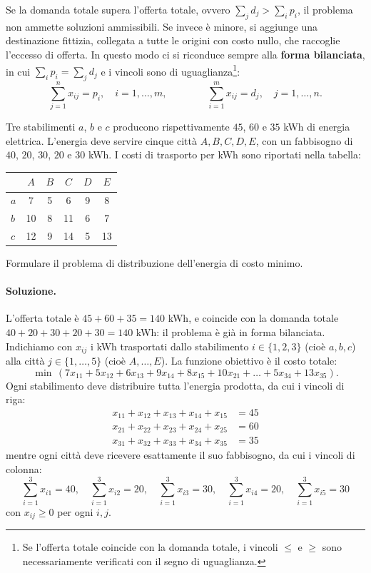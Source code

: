 Se la domanda totale supera l'offerta totale, ovvero $\sum_j d_j > \sum_i p_i$, il problema non ammette soluzioni ammissibili. Se invece è minore, si aggiunge una destinazione fittizia, collegata a tutte le origini con costo nullo, che raccoglie l'eccesso di offerta. In questo modo ci si riconduce sempre alla \textbf{forma bilanciata}, in cui $\sum_i p_i = \sum_j d_j$ e i vincoli sono di uguaglianza\footnote{Se l'offerta totale coincide con la domanda totale, i vincoli $\le$ e $\ge$ sono necessariamente verificati con il segno di uguaglianza.}:
\[
\sum_{j=1}^{n} x_{ij} = p_i, \quad i = 1, \dots, m, \qquad\qquad \sum_{i=1}^{m} x_{ij} = d_j, \quad j = 1, \dots, n.
\]

\begin{esercizio}
Tre stabilimenti $a$, $b$ e $c$ producono rispettivamente $45$, $60$ e $35$ kWh di energia elettrica. L'energia deve servire cinque città $A, B, C, D, E$, con un fabbisogno di $40$, $20$, $30$, $20$ e $30$ kWh. I costi di trasporto per kWh sono riportati nella tabella:
\begin{center}
\begin{tabular}{lccccc}
\toprule
 & $A$ & $B$ & $C$ & $D$ & $E$ \\
\midrule
$a$ & 7 & 5 & 6 & 9 & 8 \\
$b$ & 10 & 8 & 11 & 6 & 7 \\
$c$ & 12 & 9 & 14 & 5 & 13 \\
\bottomrule
\end{tabular}
\end{center}
Formulare il problema di distribuzione dell'energia di costo minimo.
\end{esercizio}

\paragraph{Soluzione.}
L'offerta totale è $45 + 60 + 35 = 140$ kWh, e coincide con la domanda totale $40 + 20 + 30 + 20 + 30 = 140$ kWh: il problema è già in forma bilanciata. Indichiamo con $x_{ij}$ i kWh trasportati dallo stabilimento $i \in \{1, 2, 3\}$ (cioè $a, b, c$) alla città $j \in \{1, \dots, 5\}$ (cioè $A, \dots, E$). La funzione obiettivo è il costo totale:
\[
\min\, (7x_{11} + 5x_{12} + 6x_{13} + 9x_{14} + 8x_{15} + 10x_{21} + \dots + 5x_{34} + 13x_{35}).
\]
Ogni stabilimento deve distribuire tutta l'energia prodotta, da cui i vincoli di riga:
\[
\begin{aligned}
x_{11} + x_{12} + x_{13} + x_{14} + x_{15} &= 45 \\
x_{21} + x_{22} + x_{23} + x_{24} + x_{25} &= 60 \\
x_{31} + x_{32} + x_{33} + x_{34} + x_{35} &= 35
\end{aligned}
\]
mentre ogni città deve ricevere esattamente il suo fabbisogno, da cui i vincoli di colonna:
\[
\sum_{i=1}^{3} x_{i1} = 40, \quad
\sum_{i=1}^{3} x_{i2} = 20, \quad
\sum_{i=1}^{3} x_{i3} = 30, \quad
\sum_{i=1}^{3} x_{i4} = 20, \quad
\sum_{i=1}^{3} x_{i5} = 30
\]
con $x_{ij} \ge 0$ per ogni $i, j$.

